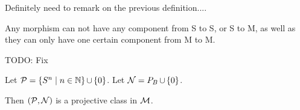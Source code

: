 \begin{remark}
    Definitely need to remark on the previous definition.... 
    
    Any morphism can not have any component from S to S, or S to M, as well as they can only have one certain component from M to M.

    TODO: Fix
\end{remark}

\begin{example} %
    Let \( {\mathcal{P}} = \left\{  S^n \mid n \in {\mathbb{N}}  \right\} \mathop{\cup}\limits \left\{  0  \right\} \). Let \( {\mathcal{N}} = P_B \mathop{\cup}\limits \left\{  0  \right\} \).

    Then \( \left(  {\mathcal{P}}, {\mathcal{N}} \right) \) is a projective class in \( {\mathcal{M}} \).
\end{example}
